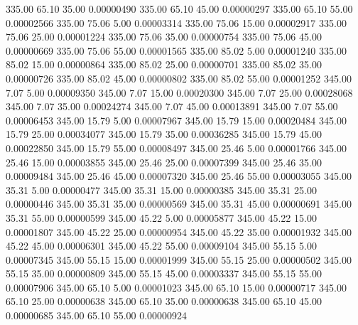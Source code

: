     335.00     65.10     35.00     0.00000490
    335.00     65.10     45.00     0.00000297
    335.00     65.10     55.00     0.00002566
    335.00     75.06      5.00     0.00003314
    335.00     75.06     15.00     0.00002917
    335.00     75.06     25.00     0.00001224
    335.00     75.06     35.00     0.00000754
    335.00     75.06     45.00     0.00000669
    335.00     75.06     55.00     0.00001565
    335.00     85.02      5.00     0.00001240
    335.00     85.02     15.00     0.00000864
    335.00     85.02     25.00     0.00000701
    335.00     85.02     35.00     0.00000726
    335.00     85.02     45.00     0.00000802
    335.00     85.02     55.00     0.00001252
    345.00      7.07      5.00     0.00009350
    345.00      7.07     15.00     0.00020300
    345.00      7.07     25.00     0.00028068
    345.00      7.07     35.00     0.00024274
    345.00      7.07     45.00     0.00013891
    345.00      7.07     55.00     0.00006453
    345.00     15.79      5.00     0.00007967
    345.00     15.79     15.00     0.00020484
    345.00     15.79     25.00     0.00034077
    345.00     15.79     35.00     0.00036285
    345.00     15.79     45.00     0.00022850
    345.00     15.79     55.00     0.00008497
    345.00     25.46      5.00     0.00001766
    345.00     25.46     15.00     0.00003855
    345.00     25.46     25.00     0.00007399
    345.00     25.46     35.00     0.00009484
    345.00     25.46     45.00     0.00007320
    345.00     25.46     55.00     0.00003055
    345.00     35.31      5.00     0.00000477
    345.00     35.31     15.00     0.00000385
    345.00     35.31     25.00     0.00000446
    345.00     35.31     35.00     0.00000569
    345.00     35.31     45.00     0.00000691
    345.00     35.31     55.00     0.00000599
    345.00     45.22      5.00     0.00005877
    345.00     45.22     15.00     0.00001807
    345.00     45.22     25.00     0.00000954
    345.00     45.22     35.00     0.00001932
    345.00     45.22     45.00     0.00006301
    345.00     45.22     55.00     0.00009104
    345.00     55.15      5.00     0.00007345
    345.00     55.15     15.00     0.00001999
    345.00     55.15     25.00     0.00000502
    345.00     55.15     35.00     0.00000809
    345.00     55.15     45.00     0.00003337
    345.00     55.15     55.00     0.00007906
    345.00     65.10      5.00     0.00001023
    345.00     65.10     15.00     0.00000717
    345.00     65.10     25.00     0.00000638
    345.00     65.10     35.00     0.00000638
    345.00     65.10     45.00     0.00000685
    345.00     65.10     55.00     0.00000924
